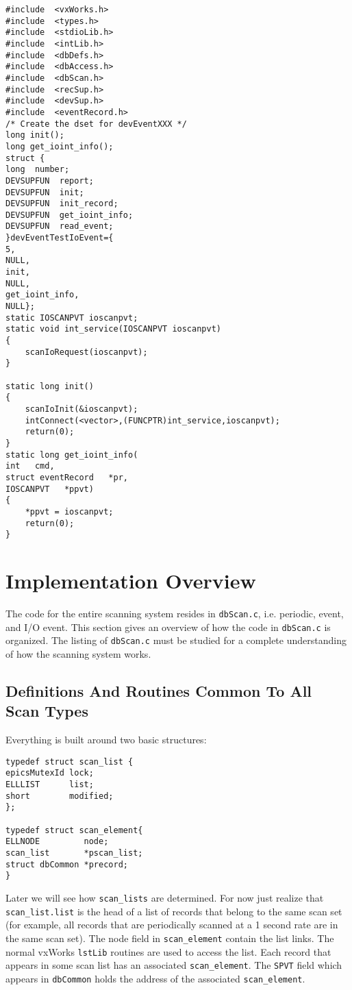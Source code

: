 \begin{verbatim}#include  <vxWorks.h>
#include  <types.h>
#include  <stdioLib.h>
#include  <intLib.h>
#include  <dbDefs.h>
#include  <dbAccess.h>
#include  <dbScan.h>
#include  <recSup.h>
#include  <devSup.h>
#include  <eventRecord.h>
/* Create the dset for devEventXXX */
long init();
long get_ioint_info();
struct {
long  number;
DEVSUPFUN  report;
DEVSUPFUN  init;
DEVSUPFUN  init_record;
DEVSUPFUN  get_ioint_info;
DEVSUPFUN  read_event;
}devEventTestIoEvent={
5,
NULL,
init,
NULL,
get_ioint_info,
NULL};
static IOSCANPVT ioscanpvt;
static void int_service(IOSCANPVT ioscanpvt)
{
    scanIoRequest(ioscanpvt);
}

static long init()
{
    scanIoInit(&ioscanpvt);
    intConnect(<vector>,(FUNCPTR)int_service,ioscanpvt);
    return(0);
}
static long get_ioint_info(
int   cmd,
struct eventRecord   *pr,
IOSCANPVT   *ppvt)
{
    *ppvt = ioscanpvt;
    return(0);
}
\end{verbatim}\section{Implementation Overview}

The code for the entire scanning system resides in \verb|dbScan.c|, i.e. periodic, event, and I/O event. This section gives an 
overview of how the code in \verb|dbScan.c| is organized. The listing of \verb|dbScan.c| must be studied for a complete 
understanding of how the scanning system works.

\subsection{Definitions And Routines Common To All Scan Types}

Everything is built around two basic structures:

\begin{verbatim}typedef struct scan_list {
epicsMutexId lock;
ELLLIST      list;
short        modified;
};

typedef struct scan_element{
ELLNODE         node;
scan_list       *pscan_list;
struct dbCommon *precord;
}
\end{verbatim}Later we will see how \verb|scan_lists| are determined. For now just realize that \verb|scan_list.list| is the head of a list of 
records that belong to the same scan set (for example, all records that are periodically scanned at a 1 second rate are in the 
same scan set). The node field in \verb|scan_element| contain the list links. The normal vxWorks \verb|lstLib| routines are used 
to access the list. Each record that appears in some scan list has an associated \verb|scan_element|. The \verb|SPVT| field which 
appears in \verb|dbCommon| holds the address of the associated \verb|scan_element|.

